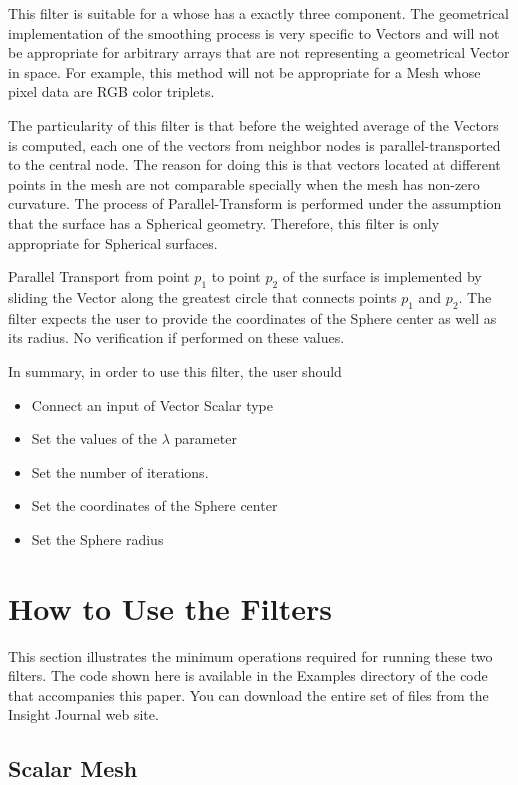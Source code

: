 \documentclass{InsightArticle}
\begin{document}
This filter is suitable for a  whose  has a
exactly three component. The geometrical implementation of the smoothing
process is very specific to Vectors and will not be appropriate for arbitrary
arrays that are not representing a geometrical Vector in space. For example,
this method will not be appropriate for a Mesh whose pixel data are RGB color
triplets.

The particularity of this filter is that before the weighted average of the
Vectors is computed, each one of the vectors from neighbor nodes is
parallel-transported to the central node. The reason for doing this is that
vectors located at different points in the mesh are not comparable specially
when the mesh has non-zero curvature. The process of Parallel-Transform is
performed under the assumption that the surface has a Spherical geometry.
Therefore, this filter is only appropriate for Spherical surfaces.

Parallel Transport from point $p_1$ to point $p_2$ of the surface is
implemented by sliding the Vector along the greatest circle that connects
points $p_1$ and $p_2$. The filter expects the user to provide the coordinates
of the Sphere center as well as its radius. No verification if performed on
these values.

In summary, in order to use this filter, the user should 

\begin{itemize}
\item Connect an input  of Vector Scalar type
\item Set the values of the $\lambda$ parameter
\item Set the number of iterations.
\item Set the coordinates of the Sphere center
\item Set the Sphere radius
\end{itemize}


\section{How to Use the Filters}

This section illustrates the minimum operations required for running these two
filters. The code shown here is available in the Examples directory of the code
that accompanies this paper. You can download the entire set of files from the
Insight Journal web site.

\subsection{Scalar Mesh}
\end{document}
